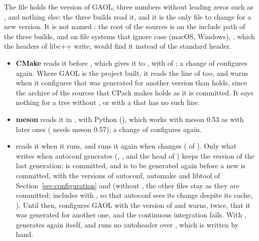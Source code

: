 \documentclass[12pt,a4paper,twoside,openright]{book}
\begin{document}
The file  holds the version of GAOL, three numbers without
leading zeros such as , and nothing else: the three builds read
it, and it is the only file to change for a new version.\newinvfive{} It is
not named : the root of the sources is on the include path of
the three builds, and on file systems that ignore case (macOS, Windows),
, which the headers of libc++ write, would find it
instead of the standard header.

\begin{itemize}
\item[$\bullet$] \textbf{CMake} reads it before , which gives
  it to , with  of
  ; a change of  configures
  again. Where GAOL is the project built, it reads the line
   of  too, and warns when it
  configures that  was generated for another version than
   holds, since the archive of the sources that CPack makes
  holds  as it is committed. It says nothing for a tree
  without , or with a  that has no such line.
\item[$\bullet$] \textbf{meson} reads it in , with Python
  (), which works with meson 0.53 as with later ones
  ( needs meson 0.57); a change of 
  configures again.
\item[$\bullet$] \textbf{} reads it when it runs, and
   runs it again when  changes
  ( of ). Only what
   writes when autoconf generates 
  (, ,
   and the head of ) keeps the
  version of the last generation:  is committed, and is to be
  generated again before a new  is committed, with the
  versions of autoconf, automake and libtool of
  Section~\ref{sec:configuration} and 
  (without  , the other files stay as they
  are committed;  includes  with
  , so that autoconf sees its change despite its cache,
  ). Until then,  configures GAOL with the
  version of  and warns, twice, that it was generated for
  another one, and the continuous integration fails. With
  ,  generates 
  again itself, and runs no autoheader over
  , which is written by hand.
\end{itemize}
\end{document}
